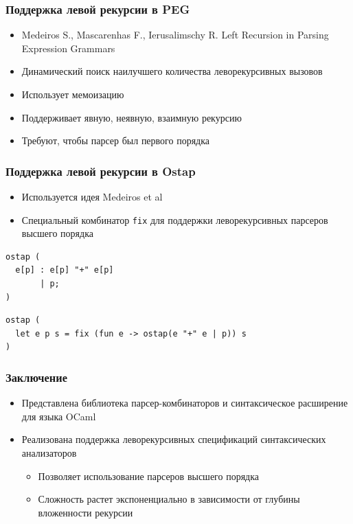 \documentclass{beamer}
\begin{document}
\begin{frame}
  \transwipe[direction=90]
  \frametitle{Поддержка левой рекурсии в PEG}
  \begin{itemize}
    \item Medeiros S., Mascarenhas F., Ierusalimschy R. Left Recursion in Parsing Expression Grammars 
    \item Динамический поиск наилучшего количества леворекурсивных вызовов
    \item Использует мемоизацию
    \item Поддерживает явную, неявную, взаимную рекурсию
    \item Требуют, чтобы парсер был первого порядка
  \end{itemize}
\end{frame}

\begin{frame}[fragile]
  \transwipe[direction=90]
  \frametitle{Поддержка левой рекурсии в Ostap}
  \begin{itemize} 
    \item Используется идея Medeiros et al
    \item Специальный комбинатор \verb!fix! для поддержки леворекурсивных парсеров высшего порядка
  \end{itemize}
\begin{lstlisting}[frame=single]  
ostap (
  e[p] : e[p] "+" e[p] 
       | p;         
)
\end{lstlisting}

\begin{lstlisting}[frame=single]  
ostap (
  let e p s = fix (fun e -> ostap(e "+" e | p)) s
)
\end{lstlisting}
\end{frame}


\begin{frame}[fragile]
  \transwipe[direction=90]
  \frametitle{Заключение}
  \begin{itemize} 
    \item Представлена библиотека парсер-комбинаторов и синтаксическое расширение для языка OCaml
    \item Реализована поддержка леворекурсивных спецификаций синтаксических анализаторов
    \begin{itemize}
      \item Позволяет использование парсеров высшего порядка
      \item Сложность растет экспоненциально в зависимости от глубины вложенности рекурсии
    \end{itemize}
  \end{itemize}
\end{frame}
\end{document}
